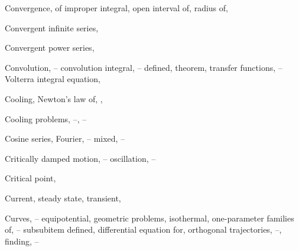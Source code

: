 \begin{theindex}
  \item Convergence,
    \subitem of improper integral, \pageref{eq:8.1.1}
    \subitem open interval of, \pageref{thmtype:7.1.2}
    \subitem radius of, \pageref{thmtype:7.1.2}

  \item Convergent infinite series, \pageref{thmtype:12.1.2}

  \item Convergent power series, \pageref{thmtype:7.1.1}

  \item Convolution, \pageref{eq:8.6.1}--\pageref{exer:8.6.14}
    \subitem convolution integral, \pageref{example:8.6.5}--\pageref{exer:8.6.6}
    \subitem defined, \pageref{thmtype:8.6.1}
    \subitem theorem, \pageref{thmtype:8.6.2}
    \subitem transfer functions, \pageref{thmtype:8.6.3}--\pageref{exer:8.6.1}
    \subitem Volterra integral equation, \pageref{eq:8.6.11}

  \item Cooling, Newton's law of, \pageref{eq:1.1.5}, \pageref{eq:4.2.1}

  \item Cooling problems, \pageref{eq:4.2.1}--\pageref{example:4.2.2}, \pageref{exer:4.2.1}--\pageref{exer:4.2.7}

  \item Cosine series, Fourier, \pageref{eq:11.3.1}--\pageref{example:11.3.1}
    \subitem mixed, \pageref{eq:11.3.2}--\pageref{example:11.3.3}

  \item Critically damped motion, \pageref{example:6.2.1}--\pageref{example:6.2.2}
    \subitem oscillation, \pageref{eq:6.3.8}--\pageref{exer:6.3.1}

  \item Critical point, \pageref{eq:4.4.6}

  \item Current, \pageref{exer:6.2.26}
    \subitem steady state, \pageref{example:6.3.2}
    \subitem transient, \pageref{example:6.3.2}

  \item Curves, \pageref{example:4.5.1}--\pageref{exer:4.5.34}
    \subitem equipotential, \pageref{eq:4.5.16}
    \subitem geometric problems, \pageref{example:4.5.7}
    \subitem isothermal, \pageref{eq:4.5.16}
    \subitem one-parameter families of, \pageref{example:4.5.1}--\pageref{example:4.5.7} subsubitem defined, \pageref{thmtype:4.5.1}
      \subsubitem differential equation for, \pageref{thmtype:4.5.2}
    \subitem orthogonal trajectories, \pageref{exer:4.5.6}--\pageref{exer:4.5.1}, \pageref{exer:4.5.25}
      \subsubitem finding, \pageref{example:4.5.9}--\pageref{exer:4.5.1} 


\end{theindex}
